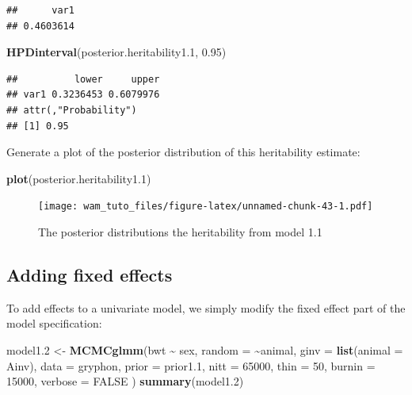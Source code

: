 \documentclass[
  12pt,
]{book}
\newenvironment{Shaded}{\begin{snugshade}}{\end{snugshade}}
\newcommand{\DataTypeTok}[1]{\textcolor[rgb]{0.13,0.29,0.53}{#1}}
\newcommand{\DecValTok}[1]{\textcolor[rgb]{0.00,0.00,0.81}{#1}}
\newcommand{\FloatTok}[1]{\textcolor[rgb]{0.00,0.00,0.81}{#1}}
\newcommand{\KeywordTok}[1]{\textcolor[rgb]{0.13,0.29,0.53}{\textbf{#1}}}
\newcommand{\NormalTok}[1]{#1}
\newcommand{\OperatorTok}[1]{\textcolor[rgb]{0.81,0.36,0.00}{\textbf{#1}}}
\newcommand{\OtherTok}[1]{\textcolor[rgb]{0.56,0.35,0.01}{#1}}
\newcommand{\StringTok}[1]{\textcolor[rgb]{0.31,0.60,0.02}{#1}}
\begin{document}
\begin{verbatim}
##      var1 
## 0.4603614
\end{verbatim}

\begin{Shaded}
\begin{Highlighting}[]
\KeywordTok{HPDinterval}\NormalTok{(posterior.heritability1}\FloatTok{.1}\NormalTok{, }\FloatTok{0.95}\NormalTok{)}
\end{Highlighting}
\end{Shaded}

\begin{verbatim}
##          lower     upper
## var1 0.3236453 0.6079976
## attr(,"Probability")
## [1] 0.95
\end{verbatim}

Generate a plot of the posterior distribution of this heritability estimate:

\begin{Shaded}
\begin{Highlighting}[]
\KeywordTok{plot}\NormalTok{(posterior.heritability1}\FloatTok{.1}\NormalTok{)}
\end{Highlighting}
\end{Shaded}

\begin{figure}
\centering
\texttt{[image: wam\_tuto\_files/figure-latex/unnamed-chunk-43-1.pdf]}
\caption{\label{fig:unnamed-chunk-43}The posterior distributions the heritability from model 1.1}
\end{figure}

\hypertarget{adding-fixed-effects-1}{%
\subsection{Adding fixed effects}\label{adding-fixed-effects-1}}

To add effects to a univariate model, we simply modify the fixed effect part of the model specification:

\begin{Shaded}
\begin{Highlighting}[]
\NormalTok{model1}\FloatTok{.2}\NormalTok{ \textless{}{-}}\StringTok{ }\KeywordTok{MCMCglmm}\NormalTok{(bwt }\OperatorTok{\textasciitilde{}}\StringTok{ }\NormalTok{sex,}
  \DataTypeTok{random =} \OperatorTok{\textasciitilde{}}\NormalTok{animal, }\DataTypeTok{ginv =} \KeywordTok{list}\NormalTok{(}\DataTypeTok{animal =}\NormalTok{ Ainv),}
  \DataTypeTok{data =}\NormalTok{ gryphon, }\DataTypeTok{prior =}\NormalTok{ prior1}\FloatTok{.1}\NormalTok{,}
  \DataTypeTok{nitt =} \DecValTok{65000}\NormalTok{, }\DataTypeTok{thin =} \DecValTok{50}\NormalTok{, }\DataTypeTok{burnin =} \DecValTok{15000}\NormalTok{, }\DataTypeTok{verbose =} \OtherTok{FALSE}
\NormalTok{)}
\KeywordTok{summary}\NormalTok{(model1}\FloatTok{.2}\NormalTok{)}
\end{Highlighting}
\end{Shaded}
\end{document}
